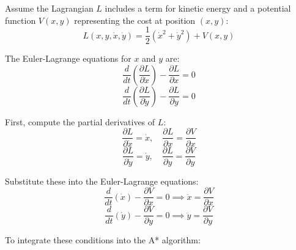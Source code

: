 \documentclass[12pt]{article}
\begin{document}
Assume the Lagrangian \( L \) includes a term for kinetic energy and a potential function \( V(x, y) \) representing the cost at position \( (x, y) \):
\begin{equation}
    L(x, y, \dot{x}, \dot{y}) = \frac{1}{2} (\dot{x}^2 + \dot{y}^2) + V(x, y)
\end{equation}

The Euler-Lagrange equations for \( x \) and \( y \) are:
\begin{equation}
    \frac{d}{dt} \left( \frac{\partial L}{\partial \dot{x}} \right) - \frac{\partial L}{\partial x} = 0
\end{equation}
\begin{equation}
    \frac{d}{dt} \left( \frac{\partial L}{\partial \dot{y}} \right) - \frac{\partial L}{\partial y} = 0
\end{equation}



First, compute the partial derivatives of \( L \):
\begin{equation}
    \frac{\partial L}{\partial \dot{x}} = \dot{x}, \quad \frac{\partial L}{\partial x} = \frac{\partial V}{\partial x}
\end{equation}
\begin{equation}
    \frac{\partial L}{\partial \dot{y}} = \dot{y}, \quad \frac{\partial L}{\partial y} = \frac{\partial V}{\partial y}
\end{equation}

Substitute these into the Euler-Lagrange equations:
\begin{equation}
    \frac{d}{dt} \left( \dot{x} \right) - \frac{\partial V}{\partial x} = 0 \implies \ddot{x} = \frac{\partial V}{\partial x}
\end{equation}
\begin{equation}
    \frac{d}{dt} \left( \dot{y} \right) - \frac{\partial V}{\partial y} = 0 \implies \ddot{y} = \frac{\partial V}{\partial y}
\end{equation}



To integrate these conditions into the A* algorithm:
\end{document}
